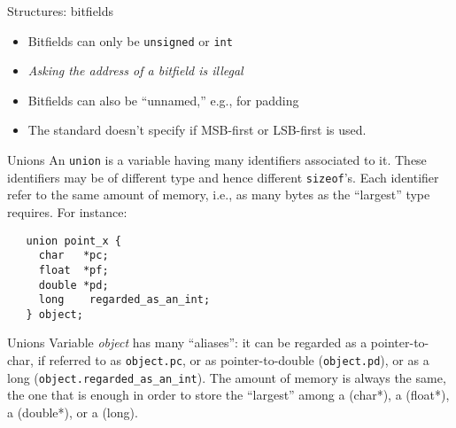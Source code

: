 \begin{frame}[fragile]{Structures: bitfields}
\begin{itemize}
\item Bitfields can only be {\tt unsigned} or
{\tt int}
\item {\em Asking the address of a bitfield is illegal}
\item Bitfields can also be ``unnamed,'' e.g., for padding
\item The standard doesn't specify if MSB-first or LSB-first is used.
\end{itemize}


\end{frame}
\begin{frame}[fragile]{Unions}
An {\tt union} is a variable having many identifiers associated to it.
These identifiers may be of different type and hence
different \verb"sizeof"'s. Each identifier refer
to the same amount of memory, i.e., as many bytes as the
``largest'' type requires.
For instance:


\vspace{20pt}

\begin{tt}
\begin{verbatim}
   union point_x {
     char   *pc;
     float  *pf;
     double *pd;
     long    regarded_as_an_int;
   } object;
\end{verbatim}
\end{tt}


\end{frame}
\begin{frame}[fragile]{Unions}
Variable {\em object\/} has many ``aliases'': it can be regarded as
a pointer-to-char, if referred to as {\tt object.pc}, or as
pointer-to-double ({\tt object.pd}), or as a long
({\tt object.regarded\_as\_an\_int}). The amount of memory is always the
same, the one that is enough in order to store the ``largest'' among
a (char*), a (float*), a (double*), or a (long).


\end{frame}
